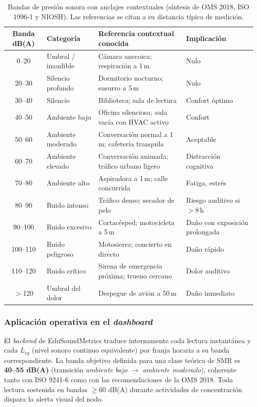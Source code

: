 \documentclass[11pt,a4paper]{article}
\begin{document}
\begin{table}[h]
\centering
{}
\begin{tabularx}{\textwidth}{c l X l}
\toprule
\rowcolor{TableHead}
\textbf{Banda dB(A)} & \textbf{Categoría} & \textbf{Referencia contextual conocida} & \textbf{Implicación} \\ \midrule
0--20    & Umbral / inaudible        & Cámara anecoica; respiración a 1\,m                   & Nulo \\
20--30   & Silencio profundo         & Dormitorio nocturno; susurro a 5\,m                   & Nulo \\
30--40   & Silencio                  & Biblioteca; sala de lectura                           & Confort óptimo \\
40--50   & Ambiente bajo             & Oficina silenciosa; aula vacía con HVAC activo        & Confort \\
50--60   & Ambiente moderado         & Conversación normal a 1\,m; cafetería tranquila       & Aceptable \\
60--70   & Ambiente elevado          & Conversación animada; tráfico urbano ligero           & Distracción cognitiva \\
70--80   & Ambiente alto             & Aspiradora a 1\,m; calle concurrida                   & Fatiga, estrés \\
80--90   & Ruido intenso             & Tráfico denso; secador de pelo                        & Riesgo auditivo si $>$8\,h \\
90--100  & Ruido excesivo            & Cortacésped; motocicleta a 5\,m                       & Daño con exposición prolongada \\
100--110 & Ruido peligroso           & Motosierra; concierto en directo                      & Daño rápido \\
110--120 & Ruido crítico             & Sirena de emergencia próxima; trueno cercano          & Dolor auditivo \\
$>$120   & Umbral del dolor          & Despegue de avión a 50\,m                             & Daño inmediato \\ \bottomrule
\end{tabularx}
\caption{Bandas de presión sonora con anclajes contextuales (síntesis de OMS 2018, ISO 1996-1 y NIOSH). Las referencias se citan a su distancia típica de medición.}
\end{table}

\subsubsection{Aplicación operativa en el \textit{dashboard}}
El \textit{backend} de EduSoundMetrics traduce internamente cada lectura instantánea y cada $L_{eq}$ (nivel sonoro continuo equivalente) por franja horaria a su banda correspondiente. La banda objetivo definida para una clase teórica de SMR es \textbf{40--55 dB(A)} (transición \textit{ambiente bajo} $\rightarrow$ \textit{ambiente moderado}), coherente tanto con ISO 9241-6 como con las recomendaciones de la OMS 2018. Toda lectura sostenida en bandas $\geq 60$ dB(A) durante actividades de concentración dispara la alerta visual del nodo.
\end{document}
